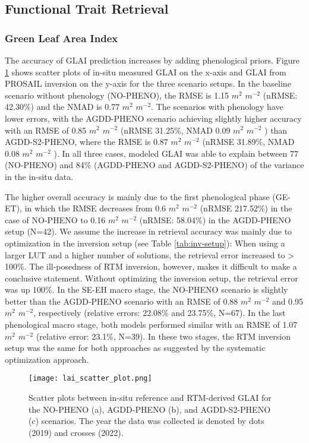 \subsection{Functional Trait Retrieval}
\label{subsec:res-trait-retrieval}
\subsubsection{Green Leaf Area Index}

The accuracy of \gls{GLAI} prediction increases by adding phenological priors. Figure \ref{fig:glai-val-scatter} shows scatter plots of in-situ measured \gls{GLAI} on the x-axis and \gls{GLAI} from PROSAIL inversion on the y-axis for the three scenario setups. In the baseline scenario without phenology (NO-PHENO), the RMSE is 1.15 $m^2$ $m^{-2}$ (nRMSE: 42.30\%) and the NMAD is 0.77 $m^2$ $m^{-2}$. The scenarios with phenology have lower errors, with the AGDD-PHENO scenario achieving slightly higher accuracy with an RMSE of 0.85 $m^2$ $m^{-2}$  (nRMSE 31.25\%, NMAD 0.09 $m^2$ $m^{-2}$ ) than AGDD-S2-PHENO, where the RMSE is 0.87 $m^2$ $m^{-2}$ (nRMSE 31.89\%, NMAD 0.08 $m^2$ $m^{-2}$ ). In all three cases, modeled \gls{GLAI} was able to explain between 77 (NO-PHENO) and 84\% (AGDD-PHENO and AGDD-S2-PHENO) of the variance in the in-situ data.

The higher overall accuracy is mainly due to the first phenological phase (GE-ET), in which the RMSE decreases from 0.6 $m^2$ $m^{-2}$ (nRMSE 217.52\%) in the case of NO-PHENO to 0.16 $m^2$ $m^{-2}$ (nRMSE: 58.04\%) in the AGDD-PHENO setup (N=42). We assume the increase in retrieval accuracy was mainly due to optimization in the inversion setup (see Table \ref{tab:inv-setup}): When using a larger \gls{LUT} and a higher number of solutions, the retrieval error increased to > 100\%. The ill-posedness of \gls{RTM} inversion, however, makes it difficult to make a conclusive statement. Without optimizing the inversion setup, the retrieval error was up 100\%. In the SE-EH macro stage, the NO-PHENO scenario is slightly better than the AGDD-PHENO scenario with an RMSE of 0.88 $m^2$ $m^{-2}$ and 0.95 $m^2$ $m^{-2}$, respectively (relative errors: 22.08\% and 23.75\%, N=67). In the last phenological macro stage, both models performed similar with an RMSE of 1.07 $m^2$ $m^{-2}$ (relative error: 23.1\%, N=39). In these two stages, the \gls{RTM} inversion setup was the same for both approaches as suggested by the systematic optimization approach.

\begin{figure}[H]
    \centering
    \texttt{[image: lai\_scatter\_plot.png]}
    \caption[Scatter plots between in-situ reference and RTM-derived \gls{GLAI} for the NO-PHENO (a), AGDD-PHENO (b), and AGDD-S2-PHENO (c) scenarios. The year the data was collected is denoted by dots (2019) and crosses (2022).]{Scatter plots between in-situ reference and RTM-derived \gls{GLAI} for the NO-PHENO (a), AGDD-PHENO (b), and AGDD-S2-PHENO (c) scenarios. The year the data was collected is denoted by dots (2019) and crosses (2022).}
    \label{fig:glai-val-scatter}
\end{figure}

